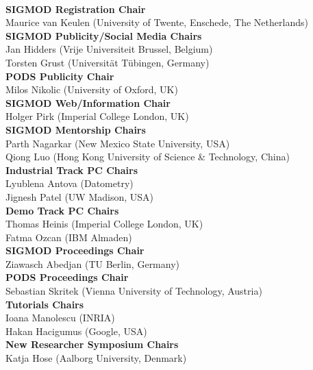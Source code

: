 {\\[2.4ex]
\textbf{SIGMOD Registration Chair}
\\ Maurice van Keulen \textsf{\footnotesize(University of Twente, Enschede, The Netherlands)}
\\[2.4ex]
\textbf{SIGMOD Publicity/Social Media Chairs}
\\ Jan Hidders \textsf{\footnotesize(Vrije Universiteit Brussel, Belgium)}
\\ Torsten Grust \textsf{\footnotesize(Universität Tübingen, Germany)}
\\[2.4ex]
\textbf{PODS Publicity Chair}
\\ Milos Nikolic \textsf{\footnotesize(University of Oxford, UK)}
\\[2.4ex]
\textbf{SIGMOD Web/Information Chair}
\\ Holger Pirk \textsf{\footnotesize(Imperial College London, UK)}
\\[2.4ex]
\textbf{SIGMOD Mentorship Chairs}
\\ Parth Nagarkar \textsf{\footnotesize(New Mexico State University, USA)}
\\ Qiong Luo \textsf{\footnotesize(Hong Kong University of Science \& Technology, China)}
\\[2.4ex]
\textbf{Industrial Track PC Chairs}
\\ Lyublena Antova \textsf{\footnotesize(Datometry)}
\\ Jignesh Patel \textsf{\footnotesize(UW Madison, USA)}
\\[2.4ex]
\textbf{Demo Track PC Chairs}
\\ Thomas Heinis \textsf{\footnotesize(Imperial College London, UK)}
\\ Fatma Ozcan \textsf{\footnotesize(IBM Almaden)}
\\[2.4ex]
\textbf{SIGMOD Proceedings Chair}
\\ Ziawasch Abedjan \textsf{\footnotesize(TU Berlin, Germany)}
\\[2.4ex]
\textbf{PODS Proceedings Chair}
\\ Sebastian Skritek \textsf{\footnotesize(Vienna University of Technology, Austria)}
\\[2.4ex]
\textbf{Tutorials Chairs}
\\ Ioana Manolescu \textsf{\footnotesize(INRIA)}
\\ Hakan Hacigumus \textsf{\footnotesize(Google, USA)}
\\[2.4ex]
\textbf{New Researcher Symposium Chairs}
\\ Katja Hose \textsf{\footnotesize(Aalborg University, Denmark)}
}
